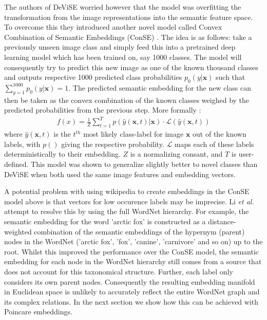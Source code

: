 \documentclass[12pt]{report}
\begin{document}
The authors of DeViSE worried however that the model was overfitting the transformation from the image representations into the semantic feature space. To overcome this they introduced another novel model called Convex Combination of Semantic Embeddings (ConSE) \cite{Norouzi2013}. The idea is as follows: take a previously unseen image class and simply feed this into a pretrained deep learning model which has been trained on, say 1000 classes. The model will consequently try to predict this new image as one of the known thousand classes and outputs respective 1000 predicted class probabilities $p_0 (y | \mathbf{x})$ such that $\sum_{y=1}^{1000} p_0 (y | \mathbf{x}) = 1$. The predicted semantic embedding for the new class can then be taken as the convex combination of the known classes weighed by the predicted probabilities from the previous step. More formally \cite{Norouzi2013}:
\begin{align}
  f(x) = \frac{1}{Z}\sum_{t=1}^T p(\hat{y}(\mathbf{x}, t)| \mathbf{x}) \cdot \mathcal{L}(\hat{y}(\mathbf{x}, t))
\end{align}
where $\hat{y}(\mathbf{x}, t)$ is the $t^{th}$ most likely class-label for image $\mathbf{x}$ out of the known labels, with $p()$ giving the respective probability. $\mathcal{L}$ maps each of these labels deterministically to their embedding. $Z$ is a normalizing consant, and $T$ is user-defined. This model was shown to generalize slightly better to novel classes than DeViSE when both used the same image features and embedding vectors. 

A potential problem with using wikipedia to create embeddings in the ConSE model above is that vectors for low occurence labels may be imprecise. Li \textit{et al.} attempt to resolve this by using the full WordNet hierarchy. For example, the semantic embedding for the word 'arctic fox' is constructed as a distance-weighted combination of the semantic embeddings of the hypernym (parent) nodes in the WordNet ('arctic fox', 'fox', 'canine', 'carnivore' and so on) up to the root. Whilst this improved the performance over the ConSE model, the semantic embedding for each node in the WordNet hierarchy still comes from a source that does not account for this taxonomical structure. Further, each label only considers its own parent nodes. Consequently the resulting embedding manifold in Euclidean space is unlikely to accurately reflect the entire WordNet graph and its complex relations. In the next section we show how this can be achieved with Poincare embeddings.
\end{document}
